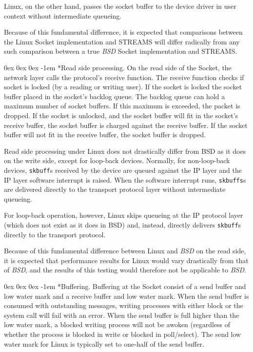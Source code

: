 \documentclass[letterpaper,final,notitlepage,twocolumn,10pt,twoside]{article}
\makeatletter
\let\normalsize\small
\let\small\footnotesize
\let\footnotesize\scriptsize
\let\scriptsize\tiny
\renewcommand\subparagraph{\@startsection{subparagraph}{5}{\parindent}%
                                       {0ex \@plus 0ex \@minus 0ex}%
                                       {-1em}%
                                      {\normalfont\normalsize\bfseries\slshape}}
\makeatother
\begin{document}
Linux, on the other hand, passes the socket buffer to the device driver in
user context without intermediate queueing.

Because of this fundamental difference, it is expected that comparisons
between the Linux Socket implementation and STREAMS will differ radically from
any such comparison between a true \textsl{BSD} Socket implementation and
STREAMS.

\subparagraph*{Read side processing.} On the read side of the Socket, the
network layer calls the protocol's receive function.  The receive function
checks if socket is locked (by a reading or writing user).  If the socket is
locked the socket buffer placed in the socket's backlog queue.  The backlog
queue can hold a maximum number of socket buffers.  If this maximum is
exceeded, the packet is dropped.  If the socket is unlocked, and the socket
buffer will fit in the socket's receive buffer, the socket buffer is charged
against the receive buffer.  If the socket buffer will not fit in the receive
buffer, the socket buffer is dropped.

Read side processing under Linux does not drastically differ from BSD as it
does on the write side, except for loop-back devices.  Normally, for
non-loop-back devices, \texttt{skbuff}s received by the device are queued
against the IP layer and the IP layer software interrupt is raised.  When the
software interrupt runs, \texttt{skbuffs}s are delivered directly to the
transport protocol layer without intermediate queueing.

For loop-back operation, however, Linux skips queueing at the IP protocol
layer (which does not exist as it does in BSD) and, instead, directly delivers
\texttt{skbuff}s directly to the transport protocol.

Because of this fundamental difference between Linux and \textsl{BSD} on the
read side, it is expected that performance results for Linux would vary
drastically from that of \textsl{BSD}, and the results of this testing would
therefore not be applicable to \textsl{BSD}.

\subparagraph*{Buffering.} Buffering at the Socket consist of a send buffer
and low water mark and a receive buffer and low water mark.  When the send
buffer is consumed with outstanding messages, writing processes with either
block or the system call will fail with an error.   When the send buffer is
full higher than the low water mark, a blocked writing process will not be
awoken (regardless of whether the process is blocked in write or blocked in
poll/select).  The send low water mark for Linux is typically set to one-half
of the send buffer.
\end{document}
